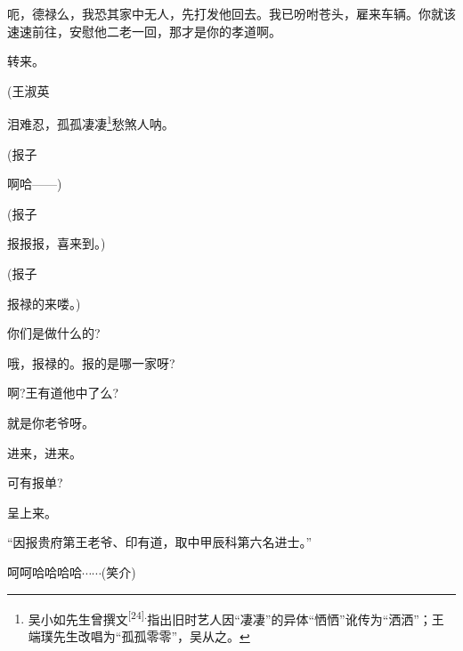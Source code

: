 {{呃，德禄么，我恐其家中无人，先打发他回去。我已吩咐苍头，雇来车辆。你就该速速前往，安慰他二老一回，那才是你的孝道啊。}


{转来。}\hspace{40pt}~




{(王淑英\hspace{40pt}~

 }

泪难忍，孤孤凄凄\footnote{吴小如先生曾撰文\textsuperscript{{[}24{]}.}指出旧时艺人因``凄凄''的异体``恓恓''讹传为``洒洒''；王端璞先生改唱为``孤孤零零''，吴从之。}愁煞人{呐}。

{(报子\hspace{40pt}~

啊哈------)}

{(报子\hspace{40pt}~

报报报，喜来到。)}

{(报子\hspace{40pt}~

报禄的来喽。)}

{你们是做什么的?}\hspace{20pt}~

{哦，报禄的。报的是哪一家呀?}

{啊?王有道他中了么?}\hspace{10pt}~

{就是你老爷呀。}\hspace{20pt}~

{进来，进来。}\hspace{30pt}~

{可有报单?}\hspace{30pt}~

{呈上来。}\hspace{30pt}~

{``因报贵府第王老爷、印有道，取中甲辰科第六名进士。''}

{呵呵哈哈哈哈$\cdots{}\cdots{}$({\hwfs 笑}{\hwfs 介})}

}
